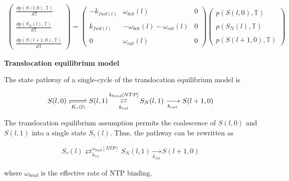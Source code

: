 \documentclass[10pt,letterpaper]{article}
\begin{document}
\begin{eqnarray}
    \begin{pmatrix}
        \frac{d p( S(l,0), \mathbb{T} )}{d\mathbb{T}} \\ \\
        \frac{d p( S_N(l), \mathbb{T} )}{d\mathbb{T}} \\ \\
        \frac{d p( S(l+1,0), \mathbb{T} )}{d\mathbb{T}}
    \end{pmatrix} =
    \begin{pmatrix}
        -k_{fwd(l)} & \omega_{bck}(l) & 0 \\ \\
        k_{fwd(l)} & -\omega_{bck}(l) - \omega_{cat}(l) & 0 \\ \\
        0 & \omega_{cat}(l) & 0
    \end{pmatrix}
    \begin{pmatrix}
        p( S(l,0), \mathbb{T} ) \\ \\
        p( S_N(l), \mathbb{T} ) \\ \\
        p( S(l+1,0), \mathbb{T} )
    \end{pmatrix}
\end{eqnarray}



\textbf{Translocation equilibrium model} \par


The state pathway of a single-cycle of the translocation equilibrium model is


\begin{eqnarray}
S(l,0) \xrightleftharpoons[K_\tau(l)]{}  S(l,1) \mathop{\rightleftarrows}_{k_{rel}}^{k_{bind}[NTP]} S_N(l,1)  \xrightarrow[k_{cat}]{} S(l+1,0)
\end{eqnarray}



The translocation equilibrium assumption permits the coalescence of $S(l,0)$ and $S(l,1)$ into a single state $S_\tau(l)$. Thus, the pathway can be rewritten as


\begin{eqnarray}
S_\tau(l) \mathop{\rightleftarrows}_{k_{rel}}^{\omega_{bind}[NTP]} S_N(l,1)  \xrightarrow[k_{cat}]{} S(l+1,0)
\end{eqnarray}


where $\omega_{bind}$ is the effective rate of NTP binding.
\end{document}
